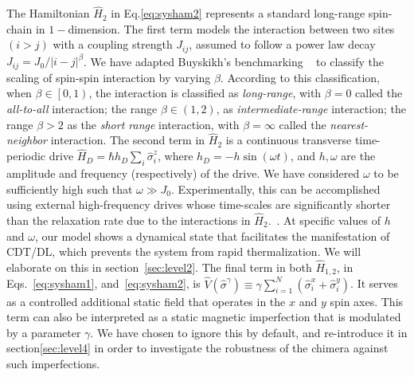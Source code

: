 \documentclass[%
nofootinbib,
reprint,
superscriptaddress,
amsmath,amssymb,showkeys,
aps,
prb,
]{revtex4-2}
\begin{document}
	The Hamiltonian $\hat{H}_2$ in Eq.\eqref{eq:sysham2} represents a standard long-range spin-chain in $1-$dimension. The first term models the interaction between two sites $(i>j)$ with a coupling strength $J_{ij}$, assumed to follow a power law decay $J_{ij}={J_0}/{|i-j|^\beta}$. We have adapted Buyskikh's benchmarking ~\cite{buyskikh_entanglement_2016} to classify the scaling of spin-spin interaction by varying $\beta$. According to this classification, when $\beta\in\left[0,1\right)$, the interaction is classified as \textit{long-range}, with $\beta=0$ called the \textit{all-to-all} interaction; the range $\beta\in \left(1,2\right)$, as \textit{intermediate-range} interaction; the range $\beta > 2$ as the  \textit{short range} interaction, with $\beta= \infty$ called the \textit{nearest-neighbor} interaction. The second term in $\hat{H}_2$ is a continuous transverse time-periodic drive $\displaystyle \hat{H}_D=\hbar h_D \sum_i\hat{\sigma}^z_i$, where $\displaystyle h_D = -h\sin{(\omega t)}$, and $h,\omega$ are the amplitude and frequency (respectively) of the drive. We have considered $\omega$ to be sufficiently high such that $\omega\gg J_0$. 	Experimentally, this can be accomplished using external high-frequency drives whose time-scales are significantly shorter than the relaxation rate due to the interactions in $\hat{H}_2$.~\cite{choi_observation_2017,zhang_observation_2017,Cirac_1995,Blatt_2012}. At specific values of $h$ and $\omega$, our model shows a dynamical state that facilitates the manifestation of CDT/DL, which prevents the system from rapid thermalization. We will elaborate on this in section~\ref{sec:level2}. The final term in both $\hat{H}_{1,2}$, in Eqs.~\ref{eq:sysham1}, and~\ref{eq:sysham2}, is $\displaystyle \hat{V}(\hat{\sigma}^{\gamma}) \equiv\gamma  \sum_{i=1}^{N} (\hat{\sigma}^x_i + \hat{\sigma}^y_i)$. It serves as a controlled additional static field that operates in the $x$ and $y$ spin axes.  This term can also be interpreted as a static magnetic imperfection that is modulated by a parameter $\gamma$. We have chosen to ignore this by default, and re-introduce it in section\ref{sec:level4} in order to investigate the robustness of the chimera against such imperfections.
	
\end{document}
